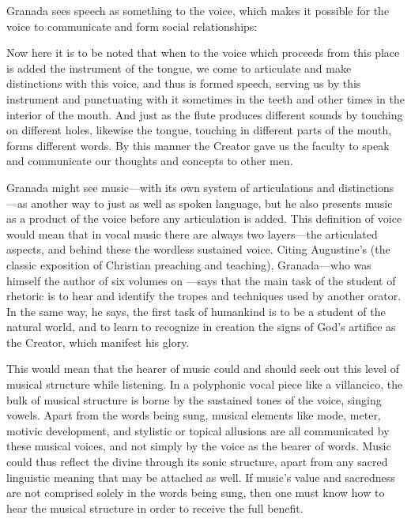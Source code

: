 Granada sees speech as something  to the voice, which makes it
possible for the voice to communicate and form social relationships:
\begin{quoting} 
    Now here it is to be noted that when to the voice which proceeds from this
    place is added the instrument of the tongue, we come to articulate and make
    distinctions with this voice, and thus is formed speech, serving us by this
    instrument and punctuating  with it sometimes in the
    teeth and other times in the interior of the mouth.
    And just as the flute produces different sounds by touching on different
    holes, likewise the tongue, touching in different parts of the mouth, forms
    different words.  
    By this manner the Creator gave us the faculty to speak and communicate our
    thoughts and concepts to other men.%
        \Autocite[252]{LuisdeGranada:Simbolo}
\end{quoting}
Granada might see music---with its own system of articulations and
distinctions---as another way to 
just as well as spoken language, but he also presents music as a product of the
voice before any articulation is added.
This definition of voice would mean that in vocal music there are always two
layers---the articulated  aspects, and behind these the wordless
sustained voice.
Citing Augustine's  (the classic exposition of
Christian preaching and teaching), Granada---who was himself the author of
six volumes on ---says that the main task of
the student of rhetoric is to hear and identify the tropes and techniques used
by another orator.
In the same way, he says, the first task of humankind is to be a student of the
natural world, and to learn to recognize in creation the signs of God's
artifice as the Creator, which manifest his glory.


This would mean that the hearer of music could and should seek out this level
of musical structure while listening.
In a polyphonic vocal piece like a villancico, the bulk of musical structure is
borne by the sustained tones of the voice, singing vowels.
Apart from the words being sung, musical elements like mode, meter, motivic
development, and stylistic or topical allusions are all communicated by these
musical voices, and not simply by the voice as the bearer of words.
Music could thus reflect the divine through its sonic structure, apart from any
sacred linguistic meaning that may be attached as well.
If music's value and sacredness are not comprised solely in the words being
sung, then one must know how to hear the musical structure in order to receive
the full benefit.

